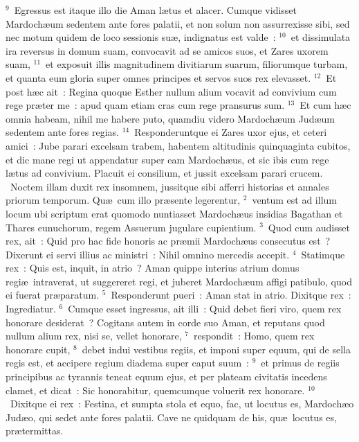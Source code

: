 ${}^{9}$~Egressus est itaque illo die Aman l\ae tus et alacer. Cumque vidisset Mardoch\ae um sedentem ante fores palatii, et non solum non assurrexisse sibi, sed nec motum quidem de loco sessionis su\ae , indignatus est valde~:
${}^{10}$~et dissimulata ira reversus in domum suam, convocavit ad se amicos suos, et Zares uxorem suam,
${}^{11}$~et exposuit illis magnitudinem divitiarum suarum, filiorumque turbam, et quanta eum gloria super omnes principes et servos suos rex elevasset.
${}^{12}$~Et post h\ae c ait~: Regina quoque Esther nullum alium vocavit ad convivium cum rege pr\ae ter me~: apud quam etiam cras cum rege pransurus sum.
${}^{13}$~Et cum h\ae c omnia habeam, nihil me habere puto, quamdiu videro Mardoch\ae um Jud\ae um sedentem ante fores regias.
${}^{14}$~Responderuntque ei Zares uxor ejus, et ceteri amici~: Jube parari excelsam trabem, habentem altitudinis quinquaginta cubitos, et dic mane regi ut appendatur super eam Mardoch\ae us, et sic ibis cum rege l\ae tus ad convivium. Placuit ei consilium, et jussit excelsam parari crucem.
~Noctem illam duxit rex insomnem, jussitque sibi afferri historias et annales priorum temporum. Qu\ae\ cum illo pr\ae sente legerentur,
${}^{2}$~ventum est ad illum locum ubi scriptum erat quomodo nuntiasset Mardoch\ae us insidias Bagathan et Thares eunuchorum, regem Assuerum jugulare cupientium.
${}^{3}$~Quod cum audisset rex, ait~: Quid pro hac fide honoris ac pr\ae mii Mardoch\ae us consecutus est~? Dixerunt ei servi illius ac ministri~: Nihil omnino mercedis accepit.
${}^{4}$~Statimque rex~: Quis est, inquit, in atrio~? Aman quippe interius atrium domus regi\ae\ intraverat, ut suggereret regi, et juberet Mardoch\ae um affigi patibulo, quod ei fuerat pr\ae paratum.
${}^{5}$~Responderunt pueri~: Aman stat in atrio. Dixitque rex~: Ingrediatur.
${}^{6}$~Cumque esset ingressus, ait illi~: Quid debet fieri viro, quem rex honorare desiderat~? Cogitans autem in corde suo Aman, et reputans quod nullum alium rex, nisi se, vellet honorare,
${}^{7}$~respondit~: Homo, quem rex honorare cupit,
${}^{8}$~debet indui vestibus regiis, et imponi super equum, qui de sella regis est, et accipere regium diadema super caput suum~:
${}^{9}$~et primus de regiis principibus ac tyrannis teneat equum ejus, et per plateam civitatis incedens clamet, et dicat~: Sic honorabitur, quemcumque voluerit rex honorare.
${}^{10}$~Dixitque ei rex~: Festina, et sumpta stola et equo, fac, ut locutus es, Mardoch\ae o Jud\ae o, qui sedet ante fores palatii. Cave ne quidquam de his, qu\ae\ locutus es, pr\ae termittas.

